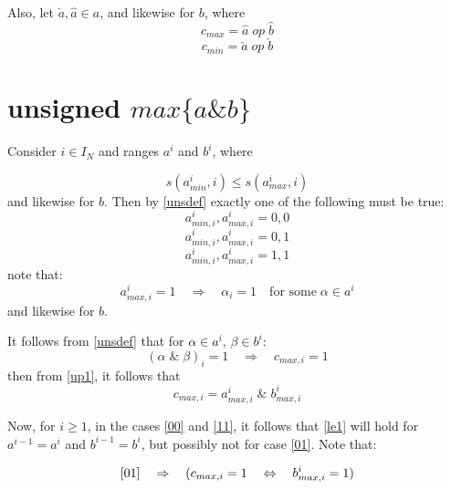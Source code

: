 \documentclass{article}
\begin{document}
Also, let $\check a, \hat a \in a$, and likewise for $b$, where
\begin{equation*}
c_{max} = \hat a \; op \; \hat b
\end{equation*}
\begin{equation*}
c_{min} = \check a \; op \; \check b
\end{equation*}


\section{unsigned $max \{a\&b\}$}\label{maxand}
Consider $i \in I_N$ and ranges $a^i$ and $b^i$, where

\begin{equation}\label{le1} s(a^i_{min},i) \le s(a^i_{max},i)\end{equation}
and likewise for $b$. Then by \eqref{unsdef} exactly one of the following must be true:
\begin{equation}\label{00} 
a^i_{min,i},a^i_{max,i} = 0,0
\end{equation}
\begin{equation}\label{01} 
a^i_{min,i},a^i_{max,i} = 0,1
\end{equation}
\begin{equation}\label{11} 
a^i_{min,i}, a^i_{max,i} = 1,1
\end{equation}
note that:
\begin{equation}\label{up1}
a^i_{max, i} = 1 \quad \Rightarrow \quad \alpha_i = 1 \quad 
\text{for some} \; \alpha \in a^i
\end{equation}
and likewise for $b$.

It follows from \eqref{unsdef} that for $\alpha \in a^i$, 
$\beta \in b^i$:
\begin{equation}
(\alpha \; \text{\&} \; \beta)_i = 1
\quad \Rightarrow \quad c_{max,i} = 1
\end{equation}
then from \eqref{up1}, it follows that 
\begin{equation}
c_{max,i} = a^i_{max,i} \; \text{\&}\; b^i_{max,i}
\end{equation}

Now, for $i \ge 1$, in the cases \eqref{00} and \eqref{11}, 
it follows that \eqref{le1} 
will hold for $a^{i-1}=a^i$ and $b^{i-1} = b^i$, but possibly
not for case \eqref{01}. Note that:

\begin{equation*}
\eqref{01} \quad \Rightarrow 
\quad (c_{max,i} = 1 \quad \Leftrightarrow \quad 
b^i_{max,i} = 1)
\end{equation*}
\end{document}
